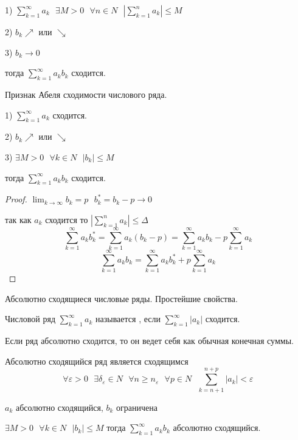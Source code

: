 \begin{block}
  1) $\sum_{k=1}^{\infty} a_k ~~~ \exists M > 0 ~~~ \forall n \in N ~~~
  |\sum_{k=1}^n a_k| \le M$

  2) $b_k \nearrow$ или $\searrow$

  3) $b_k \to 0$

  тогда $\sum_{k=1}^{\infty} a_k b_k$ сходится.
\end{block}

\begin{title}[\Large]
  Признак Абеля сходимости числового ряда.
\end{title}

\begin{block}
  1) $\sum_{k=1}^{\infty} a_k$ сходится.

  2) $b_k \nearrow$ или $\searrow$

  3) $\exists M > 0 ~~~ \forall k \in N ~~~ |b_k| \le M$

  тогда $\sum_{k=1}^{\infty} a_k b_k$ сходится.
\end{block}

\begin{proof}
  $\lim_{k \to \infty} b_k = p ~~~ b_k^* = b_k - p \to 0$

  так как $a_k$ сходится то $| \sum_{k=1}^n a_k | \le \Delta$
  $$
  \sum_{k=1}^{\infty} a_k b_k^* = \sum_{k=1}^{\infty} a_k (b_k - p) =
  \sum_{k=1}^{\infty} a_k b_k - p \sum_{k=1}^{\infty} a_k
  $$
  $$
  \sum_{k=1}^{\infty} a_k b_k = \sum_{k=1}^{\infty} a_k b_k^* +
  p\sum_{k=1}^{\infty} a_k
  $$
\end{proof}

\begin{title}
  Абсолютно сходящиеся числовые ряды. Простейшие свойства.
\end{title}

Числовой ряд $\sum_{k=1}^{\infty} a_k$ называется ,
если $\sum_{k=1}^{\infty} |a_k|$ сходится.

Если ряд абсолютно сходится, то он ведет себя как обычная конечная суммы.

\begin{theorem}
  Абсолютно сходящийся ряд является сходящимся
  $$
  \forall \varepsilon > 0 ~~~ \exists \delta_{\varepsilon} \in N ~~~
  \forall n \ge n_{\varepsilon} ~~~ \forall p \in N ~~~
  \sum_{k=n+1}^{n+p} |a_k| < \varepsilon
  $$
\end{theorem}

\begin{theorem}
  $a_k$ абсолютно сходящийся, $b_k$ ограничена

  $\exists M > 0 ~~~ \forall k \in N ~~~ |b_k| \le M$ тогда
  $\sum_{k=1}^{\infty} a_k b_k$ абсолютно сходящийся.
\end{theorem}

